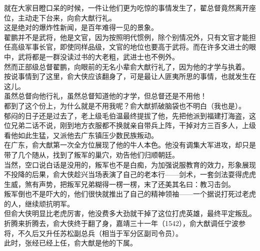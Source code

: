 \begin{multicols}{\theparacolNo}
就在大家目瞪口呆的时候，一件让他们更为吃惊的事情发生了，翟总督竟然离开座位，主动走下台来，向俞大猷行礼。\\

这是绝对的爆炸性新闻，是百年难得一见的景象。\\

翟鹏并不是武将，他是文官，因为按照明代惯例，除个别情况外，只有文官才能担任高级军事长官，即使同样品级，文官的地位也要高于武将。而在许多文进士的眼中，武将都是一群没读过书的大老粗，武进士也不例外。\\

然而正部级总督翟鹏，向眼前的无名小辈俞大猷行礼了，因为他的才学与执着。\\

按说事情到了这里，俞大侠应该翻身了，可是最让人匪夷所思的事情，也就发生在这儿。\\

虽然总督向他行礼，虽然总督知道他的才学，但总督还是不用他！\\

都到了这个份上，为什么就是不用我呢？俞大猷抓破脑袋也不明白（我也是）。\\

郁闷的日子还是过去了，老上级毛伯温最终提拔了他，先把他派到福建打海盗，这位兄弟二话不说，刚到地方衣服都不换就亲自带兵上阵，干掉对方三百多人，上级看他如此生猛，又派他去广东镇压少数民族叛动。\\

在广东，俞大猷第一次全方位展现了他的牛人本色。他没有调集大军进攻，却只是带了几个随从，找到了叛军的巢穴，劝告他们归顺朝廷。\\

当然，空口说白话是没用的，叛军也不是白痴，为加强说服教育的效力，形象展现不投降的后果，俞大侠趁兴当场表演了自己的老本行——剑术，一套剑法耍得虎虎生威，煞有声势，把叛军兄弟糊得一楞一楞，末了还美其名曰：教习击剑。\\

叛军倒也不是吓大的，他们很快就推出了自己的精神领袖——一个据说打死过老虎的人，继续顽抗明军。\\

但俞大侠明显比老虎厉害，他没费多大劲就干掉了这位打虎英雄，最终平定叛乱。\\

折腾来折腾去，俞大侠终于翻了身，嘉靖三十一年（1542），俞大猷调任宁波参将，不久后又升任苏松副总兵（相当于军分区副司令员）。\\

此时，张经已经上任，俞大猷是他的下属。\\


\end{multicols}
